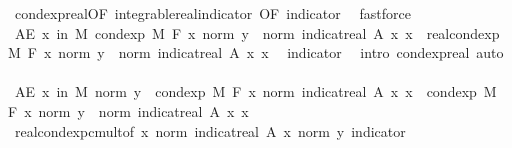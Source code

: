 \begin{isabellebody}
\ cond{\isacharunderscore}{\kern0pt}exp{\isacharunderscore}{\kern0pt}real{\isacharbrackleft}{\kern0pt}OF\ integrable{\isacharunderscore}{\kern0pt}real{\isacharunderscore}{\kern0pt}indicator{\isacharcomma}{\kern0pt}\ OF\ indicator{\isacharbrackright}{\kern0pt}\ \isamarkupfalse%
\ fastforce\isanewline
\ \ \isamarkupfalse%
\ \isamarkupfalse%
\ {\isachardoublequoteopen}AE\ x\ in\ M{\isachardot}{\kern0pt}\ cond{\isacharunderscore}{\kern0pt}exp\ M\ F\ {\isacharparenleft}{\kern0pt}{\isasymlambda}x{\isachardot}{\kern0pt}\ norm\ y\ {\isacharasterisk}{\kern0pt}\ norm\ {\isacharparenleft}{\kern0pt}indicat{\isacharunderscore}{\kern0pt}real\ A\ x{\isacharparenright}{\kern0pt}{\isacharparenright}{\kern0pt}\ x\ {\isacharequal}{\kern0pt}\ real{\isacharunderscore}{\kern0pt}cond{\isacharunderscore}{\kern0pt}exp\ M\ F\ {\isacharparenleft}{\kern0pt}{\isasymlambda}x{\isachardot}{\kern0pt}\ norm\ y\ {\isacharasterisk}{\kern0pt}\ norm\ {\isacharparenleft}{\kern0pt}indicat{\isacharunderscore}{\kern0pt}real\ A\ x{\isacharparenright}{\kern0pt}{\isacharparenright}{\kern0pt}\ x{\isachardoublequoteclose}\ \isamarkupfalse%
\ indicator\ \isamarkupfalse%
\ {\isacharparenleft}{\kern0pt}intro\ cond{\isacharunderscore}{\kern0pt}exp{\isacharunderscore}{\kern0pt}real{\isacharcomma}{\kern0pt}\ auto{\isacharparenright}{\kern0pt}\isanewline
\ \ \isamarkupfalse%
\ \isamarkupfalse%
\ {\isachardoublequoteopen}AE\ x\ in\ M{\isachardot}{\kern0pt}\ norm\ y\ {\isacharasterisk}{\kern0pt}\ cond{\isacharunderscore}{\kern0pt}exp\ M\ F\ {\isacharparenleft}{\kern0pt}{\isasymlambda}x{\isachardot}{\kern0pt}\ norm\ {\isacharparenleft}{\kern0pt}indicat{\isacharunderscore}{\kern0pt}real\ A\ x{\isacharparenright}{\kern0pt}{\isacharparenright}{\kern0pt}\ x\ {\isacharequal}{\kern0pt}\ cond{\isacharunderscore}{\kern0pt}exp\ M\ F\ {\isacharparenleft}{\kern0pt}{\isasymlambda}x{\isachardot}{\kern0pt}\ norm\ y\ {\isacharasterisk}{\kern0pt}\ norm\ {\isacharparenleft}{\kern0pt}indicat{\isacharunderscore}{\kern0pt}real\ A\ x{\isacharparenright}{\kern0pt}{\isacharparenright}{\kern0pt}\ x{\isachardoublequoteclose}\ \isamarkupfalse%
\ real{\isacharunderscore}{\kern0pt}cond{\isacharunderscore}{\kern0pt}exp{\isacharunderscore}{\kern0pt}cmult{\isacharbrackleft}{\kern0pt}of\ {\isachardoublequoteopen}{\isasymlambda}x{\isachardot}{\kern0pt}\ norm\ {\isacharparenleft}{\kern0pt}indicat{\isacharunderscore}{\kern0pt}real\ A\ x{\isacharparenright}{\kern0pt}{\isachardoublequoteclose}\ {\isachardoublequoteopen}norm\ y{\isachardoublequoteclose}{\isacharbrackright}{\kern0pt}\ indicator\ \isamarkupfalse%

\end{isabellebody}
